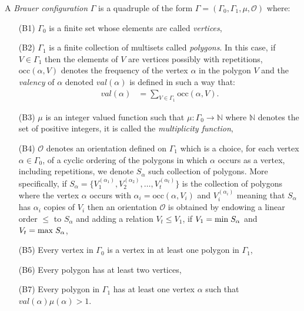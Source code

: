 \documentclass[10pt,twoside]{article}
\theoremstyle{definition}
\begin{document}
A \textit{Brauer configuration} $\Gamma$ is a quadruple of the form $\Gamma=(\Gamma_{0},\Gamma_{1},\mu,\mathcal{O})$ where:

\begin{enumerate}
\item[(B1)] $\Gamma_{0}$ is a finite set whose elements are called \textit{vertices},
\item [(B2)]  $\Gamma_{1}$ is a finite collection of multisets called \textit{polygons}. In this case, if $V\in \Gamma_{1}$ then the elements of $V$ are vertices possibly with repetitions,  $\mathrm{occ}(\alpha,V)$ denotes the frequency of the vertex $\alpha$ in the polygon $V$ and the \textit{valency} of $\alpha$ denoted  $val(\alpha)$ is defined  in such a way that: \begin{equation}
\begin{split}
val(\alpha)&=\underset{V\in\Gamma_{1}}{\sum}\mathrm{occ}(\alpha,V).
\end{split}
\end{equation}
\item [(B3)]$\mu$ is an integer valued function such that $\mu:\Gamma_{0}\rightarrow \mathbb{N}$ where $\mathbb{N}$ denotes the set of positive integers, it is called the \textit{multiplicity function},
\item[(B4)] $\mathcal{O}$ denotes an orientation defined on $\Gamma_{1}$ which is a choice, for each vertex $\alpha \in \Gamma_0$, of a cyclic ordering of the polygons in which $\alpha$ occurs as a vertex, including repetitions, we denote $S_{\alpha}$ such collection of polygons.  More specifically, if $S_{\alpha}=\{V^{(\alpha_{1})}_{1},V^{(\alpha_{2})}_{2},\dots, V^{(\alpha_t)}_{t}\}$ is the collection of polygons where the vertex $\alpha$ occurs with $\alpha_{i}=\mathrm{occ}(\alpha,V_{i})$ and $V^{(\alpha_{i})}_{i}$ meaning that $S_{\alpha}$ has $\alpha_{i}$ copies of $V_{i}$ then an orientation $\mathcal{O}$ is obtained by endowing a linear order $\leq$ to $S_{\alpha}$  and adding a relation $V_{t}\leq V_{1}$, if $V_{1}=\mathrm{min}\hspace{0.1cm}S_{\alpha}$ and $V_{t}=\mathrm{max}\hspace{0.1cm}S_{\alpha}$,
\item [(B5)] Every vertex in $\Gamma_{0}$ is a vertex in at least one polygon in $\Gamma_{1}$,
\item[(B6)] Every polygon has at least two vertices,
\item[(B7)] Every polygon in $\Gamma_{1}$ has at least one vertex $\alpha$ such that $val(\alpha)\mu(\alpha)>1$.
\end{enumerate}
\end{document}
